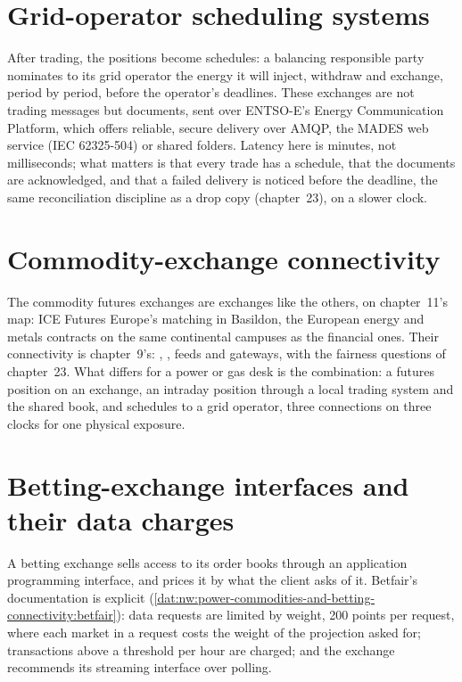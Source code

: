 \section{Grid-operator scheduling systems}

After trading, the positions become schedules: a balancing responsible party nominates to its grid operator the energy it will
inject, withdraw and exchange, period by period, before the operator's deadlines. These exchanges are not trading messages but
documents, sent over ENTSO-E's Energy Communication Platform, which offers reliable, secure delivery over AMQP, the MADES web service
(IEC 62325-504) or shared folders. Latency here is minutes, not milliseconds; what matters is that every trade has a schedule, that
the documents are acknowledged, and that a failed delivery is noticed before the deadline, the same reconciliation discipline as a
drop copy (chapter~23), on a slower clock.

\section{Commodity-exchange connectivity}

The commodity futures exchanges are exchanges like the others, on chapter~11's map: ICE Futures Europe's matching in Basildon, the
European energy and metals contracts on the same continental campuses as the financial ones. Their connectivity is chapter~9's:
, , feeds and gateways, with the fairness questions of chapter~23. What differs for a power or gas desk is
the combination: a futures position on an exchange, an intraday position through a local trading system and the shared book, and
schedules to a grid operator, three connections on three clocks for one physical exposure.

\section{Betting-exchange interfaces and their data charges}

A betting exchange sells access to its order books through an application programming interface, and prices it by what the client
asks of it. Betfair's documentation is explicit (\cref{dat:nw:power-commodities-and-betting-connectivity:betfair}): data requests are
limited by weight, 200 points per request, where each market in a request costs the weight of the projection asked for; transactions
above a threshold per hour are charged; and the exchange recommends its streaming interface over polling.

